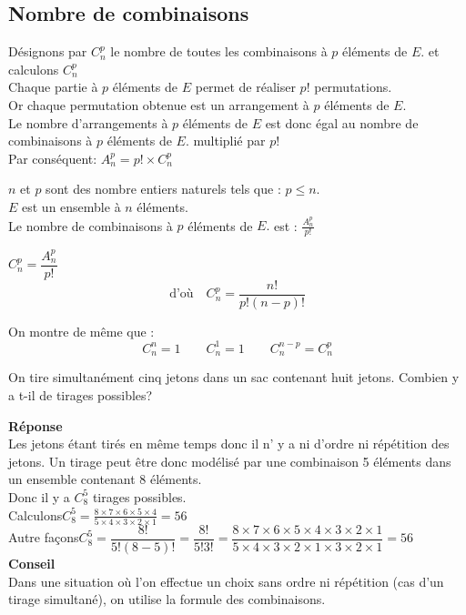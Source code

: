 \subsection*{Nombre de combinaisons}
Désignons par $ C_{n}^{p} $ le nombre de toutes les combinaisons à $ p $ éléments de $ E.$ et calculons $ C_{n}^{p} $ \\
Chaque partie à $ p $ éléments de $ E $ permet de réaliser $ p! $ permutations.\\
Or chaque permutation obtenue est un arrangement à $ p $ éléments de $ E $.\\
Le nombre d'arrangements à $ p $ éléments de $ E $ est donc égal au nombre de combinaisons à $ p $ éléments de $ E.$ multiplié par $ p! $ \\
Par conséquent:  \qquad  $ A_{n}^{p}= p! \times C_{n}^{p}$
\begin{property}
$n $ et $ p$ sont des nombre entiers naturels tels que : $ p\leq n. $\\
$ E $ est un ensemble à $ n $ éléments.\\
Le nombre de combinaisons à $ p $ éléments de $ E.$ est : $ \frac{A_{n}^{p}}{p!} $ 
\end{property}
\begin{notation}
  $ C_{n}^{p}=\dfrac{A_{n}^{p}}{p!} $
\[\textrm{d'où} \quad  C_{n}^{p}=\dfrac{n!}{p!(n-p)!} \]
\end{notation}
On montre de même que :\[C_{n}^{n}=1 \qquad  C_{n}^{1}=1  \qquad C_{n}^{n-p}= C_{n}^{p}  \]
\begin{exercice}
On tire simultanément cinq jetons dans un sac contenant huit jetons. Combien y a t-il de tirages possibles?
\end{exercice}
\textbf{Réponse}\\
Les jetons étant tirés en même temps donc il n' y a ni d'ordre ni répétition des jetons.
Un tirage  peut être donc  modélisé par une combinaison 5 éléments dans un ensemble contenant 8 éléments. \\
Donc il y a $ C_{8}^{5} $ tirages possibles.\\
Calculons\quad $ C_{8}^{5}= \frac{8 \times7 \times6\times 5\times 4}{5 \times4\times 3\times 2\times 1}=56 $ \\
Autre façons\quad $ C_{8}^{5}=\dfrac{8!}{5!(8-5)!}=\dfrac{8!}{5!3!}=\dfrac{8\times7\times6\times5\times4\times3\times2\times1}{5\times4\times3\times2\times1\times3\times2\times1}=56 $\\
\textbf{Conseil}\\
Dans une situation où l'on effectue un choix sans ordre ni répétition (cas d'un tirage simultané), on utilise  la formule des combinaisons.

